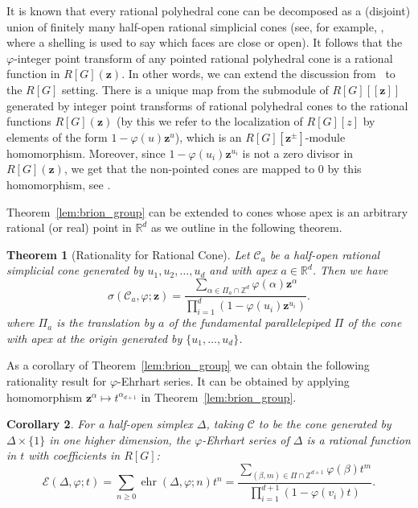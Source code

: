 \documentclass[12pt,reqno]{amsart}
\newtheorem{thm}{Theorem}[section]
\newtheorem{cor}[thm]{Corollary}
\theoremstyle{definition}
\theoremstyle{remark}
\newcommand{\R}{\mathbb{R}}
\newcommand{\Z}{\mathbb{Z}}
\renewcommand{\phi}{\varphi}
\DeclareMathOperator{\ehr}{ehr}
\begin{document}
It is known that every rational polyhedral cone can be decomposed as a (disjoint) union of finitely many half-open rational simplicial cones (see, for example, \cite{StanleyDecompositions}, where a shelling is used to say which faces are close or open). It follows that
the $\varphi$-integer point transform of any pointed rational polyhedral cone is a rational function in $R[G](\mathbf{z})$.  In other words, we can extend the discussion from~\cite[Section 11.2]{beckrobins} to the $R[G]$ setting. There is a unique map from the submodule of $R[G][[\mathbf{z}]]$ generated by integer point transforms of rational polyhedral cones to the rational functions $R[G](\mathbf{z})$ (by this we refer to the localization of $R[G][z]$ by elements of the form $1-\phi(u)\mathbf{z}^{u}$), 
which is an $R[G][\mathbf{z}^{\pm}]$-module homomorphism. Moreover, since $1-\phi(u_i)\mathbf{z}^{u_i}$ is not a zero divisor in $R[G](\mathbf z)$, we get that the non-pointed cones are mapped to 0 by this homomorphism, see \cite[Lemma 11.2]{beckrobins}. 

Theorem~\ref{lem:brion_group} can be extended to cones whose apex is an arbitrary rational (or real) point in $\R^d$ as we outline in the following theorem.

\begin{thm}[Rationality for Rational Cone]\label{thm:apex}
Let $\mathcal{C}_a$ be a half-open rational simplicial cone generated by $u_1,u_2,\ldots,u_d$ and with apex $a \in \R^d$. Then we have 
\[
\sigma(\mathcal{C}_a,\phi;\mathbf{z}) =   \frac{\sum_{\alpha \in \Pi_a \cap\Z^{d}} \varphi(\alpha) \mathbf{z}^\alpha}{\prod_{i=1}^{d}(1-\varphi(u_i)\mathbf{z}^{u_i})}.
\]
where $\Pi_a$ is the translation by $a$ of the fundamental parallelepiped $\Pi$ of the cone with apex at the origin generated by $\{u_1,\ldots,u_d\}$.
\end{thm}

As a corollary of Theorem~\ref{lem:brion_group} we can obtain the following rationality result for $\phi$-Ehrhart series. It can be obtained by applying homomorphism $\mathbf z^\alpha \mapsto t^{\alpha_{d+1}}$ in Theorem~\ref{lem:brion_group}.

\begin{cor}
\label{cor:ehrhart_group}
For a half-open simplex $\Delta$, taking $\mathcal{C}$ to be the cone generated by $\Delta \times \{1\}$ in one higher dimension, the $\varphi$-Ehrhart series of $\Delta$ is a rational function in $t$ with coefficients in $R[G]$:
\begin{equation}\label{eq:phi-ehrhart}
   \mathcal{E}(\Delta,\phi;t)=\sum_{n\geq 0} \ehr(\Delta,\varphi;n)t^n = \frac{\sum_{(\beta,m) \in \Pi\cap \Z^{d+1}} \varphi(\beta) t^m}{\prod_{i=1}^{d+1}(1-\varphi(v_i)t)}.
\end{equation}
\end{cor}
\end{document}
